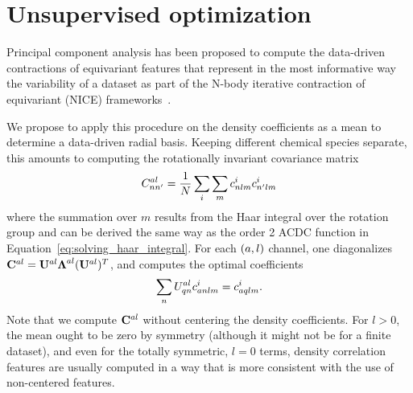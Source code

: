 \section{Unsupervised optimization}
Principal component analysis has been proposed to compute the data-driven contractions of equivariant features that represent in the most informative way the variability of a dataset as part of the N-body iterative contraction of equivariant (NICE) frameworks~\cite{niga+20jcp}.

We propose to apply this procedure on the density coefficients as a mean to determine a data-driven radial basis. 
Keeping different chemical species separate, this amounts to computing the rotationally invariant covariance matrix
\begin{equation}
  C^{a l}_{nn'}= \frac{1}{N} \sum_i \sum_m c^i_{nlm}c^i_{n^\prime lm}
\label{eq:cov}
\end{equation}
where the summation over $m$ results from the Haar integral over the rotation group and can be derived the same way as the order 2 ACDC function in Equation~\ref{eq:solving_haar_integral}.
For each $(a, l)$ channel, one diagonalizes $\mathbf{C}^{al}=\mathbf{U}^{al} \boldsymbol{\Lambda}^{al} (\mathbf{U}^{al})^T$, and computes the optimal coefficients
\begin{equation}
  \sum_n U^{a l}_{qn} c^i_{a nlm} = c^i_{a qlm} \label{eq:contract}.
\end{equation}
Note that we compute $\mathbf{C}^{al}$ without centering the density coefficients. For $l>0$, the mean ought to be zero by symmetry (although it might not be for a finite dataset), and even for the totally symmetric, $l=0$ terms, density correlation features are usually computed in a way that is more consistent with the use of non-centered features. 

